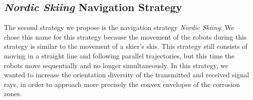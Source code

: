 \subsection{\textit{Nordic Skiing} Navigation Strategy}

The second strategy we propose is the navigation strategy \textit{Nordic Skiing}.
We chose this name for this strategy because the movement of the robots during this strategy is similar to the movement of a skier's skis.
This strategy still consists of moving in a straight line and following parallel trajectories, but this time the robots move sequentially and no longer simultaneously.
In this strategy, we wanted to increase the orientation diversity of the transmitted and received signal rays, in order to approach more precisely the convex envelopes of the corrosion zones.

